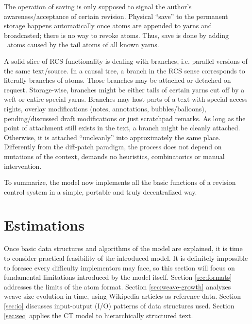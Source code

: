 \documentclass{sig-alternate}
\begin{document}
The operation of saving is only supposed to signal the author's awareness/acceptance of certain revision.
Physical ``save'' to the permanent storage happens automatically once atoms are appended to yarns and broadcasted; there is no way to revoke atoms.
Thus, save is done by  adding \zero ~atoms caused by the tail atoms of all known yarns.

A solid slice of RCS functionality is dealing with branches, i.e. parallel versions of the same text/source.
In a causal tree, a branch in the RCS sense corresponds to literally branches of atoms.
Those branches may be attached or detached on request.
Storage-wise, branches might be either tails of certain yarns cut off by a weft or entire special yarns.
Branches may host parts of a text with special access rights, overlay modifications (notes, annotations, bubbles/balloons), pending/discussed draft modifications or just scratchpad remarks.
As long as the point of attachment still exists in the text, a branch might be cleanly attached.
Otherwise, it is attached ``uncleanly'' into approximately the same place.
Differently from the diff-patch paradigm, the process does not depend on mutations of the context, demands no heuristics, combinatorics or manual intervention.

To summarize, the model now implements all the basic functions of a revision control system in a simple, portable and truly decentralized way.

\section{Estimations} \label{sec:estim}

Once basic data structures and algorithms of the model are explained,
it is time to consider practical feasibility of the introduced model.
It is definitely impossible to foresee every difficulty implementors may face, so this section will focus on fundamental limitations introduced by the model itself.
Section \ref{sec:formats} addresses the limits of the atom format.
Section \ref{sec:weave-growth} analyzes weave size evolution in time, using Wikipedia articles as reference data.
Section \ref{sec:io} discusses input-output (I/O) patterns of data structures used.
Section \ref{sec:sec} applies the CT model to hierarchically structured text.
\end{document}
